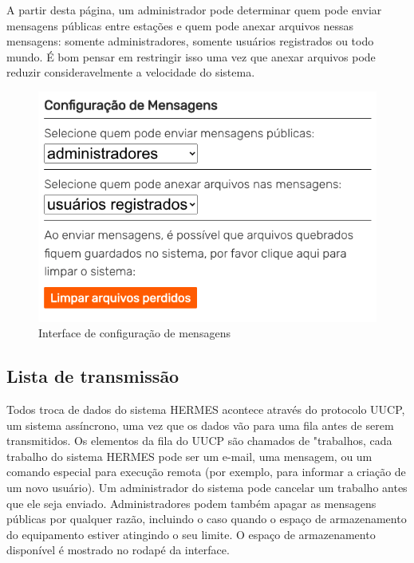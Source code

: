 \documentclass[11pt,a4paper]{article}
\begin{document}
A partir desta página, um administrador pode determinar quem pode enviar mensagens públicas entre estações e quem pode anexar arquivos nessas mensagens: somente administradores, somente usuários registrados ou todo mundo. É bom pensar em restringir isso uma vez que anexar arquivos pode reduzir consideravelmente a velocidade do sistema.


   
    \begin{figure}[H]
    \centering
    \includegraphics[width=0.5\columnwidth]{screenshots/frontend/pt_kn/messageadm.png}
    \caption{Interface de configuração de mensagens}
    \label{fig:messageadm}
   
    \end{figure}


\subsection{Lista de transmissão}
\label{gui_trans_list}

Todos troca de dados do sistema HERMES acontece através do protocolo UUCP, um sistema assíncrono, uma vez que os dados vão para uma fila antes de serem transmitidos. Os elementos da fila do UUCP são chamados de "trabalhos, cada trabalho do sistema HERMES pode ser um e-mail, uma mensagem, ou um comando especial para execução remota (por exemplo, para informar a criação de um novo usuário). Um administrador do sistema pode cancelar um trabalho antes que ele seja enviado. Administradores podem também apagar as mensagens públicas por qualquer razão, incluindo o caso quando o espaço de armazenamento do equipamento estiver atingindo o seu limite. O espaço de armazenamento disponível é mostrado no rodapé da interface. 

\end{document}
